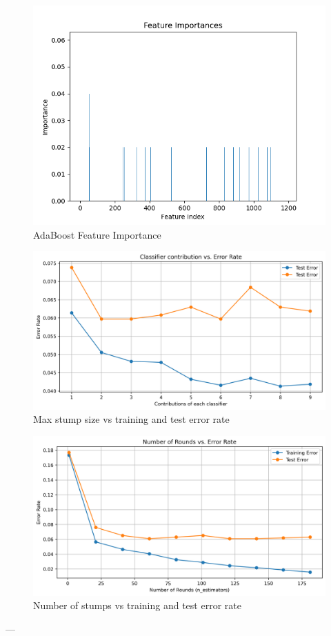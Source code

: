 \documentclass[12pt]{article}
\begin{document}
\begin{figure}[h!]
    \centering
    \includegraphics[width=0.8\linewidth]{figures/Boosted Trees/Feature Importance.png}
    \caption{AdaBoost Feature Importance}
    \label{fig:ada}
\end{figure}

\begin{figure}[h!]
    \centering
    \includegraphics[width=0.8\linewidth]{figures/Boosted Trees/learn_rate_vs_error.png}
    \caption{Max stump size vs training and test error rate}
    \label{fig:boo}
\end{figure}

\begin{figure}[h!]
    \centering
    \includegraphics[width=0.8\linewidth]{figures/Boosted Trees/round_vs_error.png}
    \caption{Number of stumps vs training and test error rate}
    \label{fig:st}
\end{figure}
---
\end{document}
